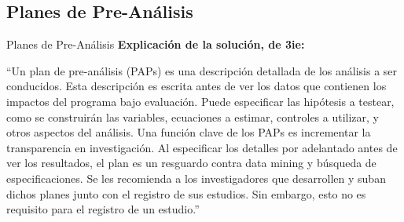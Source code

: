 \documentclass{beamer}
\begin{document}
{ %
    \begin{frame}[plain]
     \end{frame}
}

\subsection*{Planes de Pre-Análisis}
\begin{frame}{Planes de Pre-Análisis}
\textbf{Explicación de la solución, de 3ie:}

``Un plan de pre-análisis (PAPs) es una descripción detallada de los análisis a ser conducidos. Esta descripción es escrita antes de ver los datos que contienen los impactos del programa bajo evaluación. Puede especificar las hipótesis a testear, como se construirán las variables, ecuaciones a estimar, controles a utilizar, y otros aspectos del análisis. Una función clave de los PAPs es incrementar la transparencia en investigación. Al especificar los detalles por adelantado antes de ver los resultados, el plan es un resguardo contra data mining y búsqueda de especificaciones. Se les recomienda a los investigadores que desarrollen y suban dichos planes junto con el registro de sus estudios. Sin embargo, esto no es requisito para el registro de un estudio.''
\end{frame}
\end{document}
